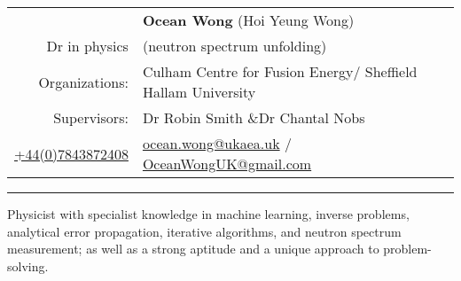 \documentclass[a4paper, 12pt]{article}
\begin{document}
\begin{table}[H]
\centering
\begin{tabular}{rl}
&\textbf{Ocean Wong} (Hoi Yeung Wong)    \\
Dr in physics& (neutron spectrum unfolding) \\
Organizations: &Culham Centre for Fusion Energy/ Sheffield Hallam University\\
Supervisors: &Dr Robin Smith \&Dr Chantal Nobs\\
\href{tel:07843872408}{+44(0)7843872408} & \href{mailto:ocean.wong@ukaea.uk}{ocean.wong@ukaea.uk} / \href{mailto:OceanWongUK@gmail.com}{OceanWongUK@gmail.com}
\end{tabular}
\end{table}
\hrule
\begin{center}
Physicist with specialist knowledge in machine learning, inverse problems, analytical error propagation, iterative algorithms, and neutron spectrum measurement; as well as a strong aptitude and a unique approach to problem-solving.
\end{center}
\end{document}
